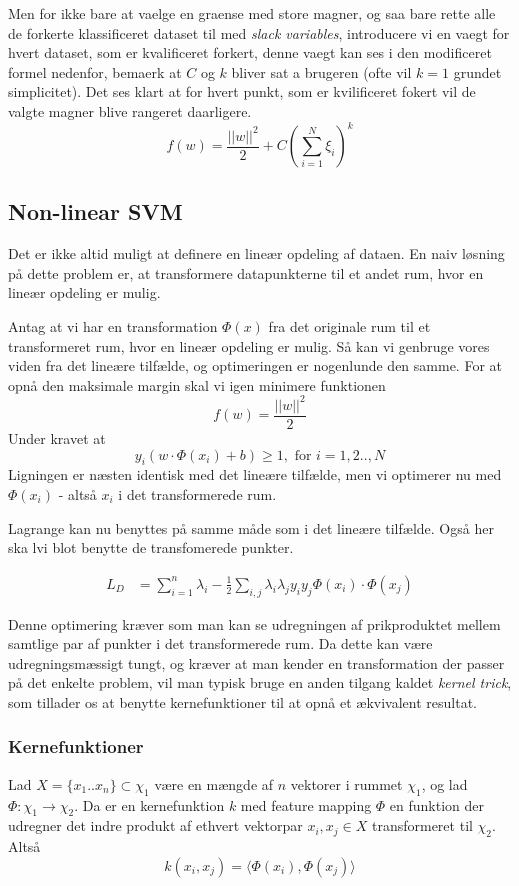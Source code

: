 \documentclass{article}
\begin{document}
Men for ikke bare at vaelge en graense med store magner, og saa bare rette alle de forkerte klassificeret dataset til med \textit{slack variables}, introducere vi en vaegt for hvert dataset, som er kvalificeret forkert, denne vaegt kan ses i den modificeret formel nedenfor, bemaerk at $C$ og $k$ bliver sat a brugeren (ofte vil $k = 1$ grundet simplicitet). Det ses klart at for hvert punkt, som er kvilificeret fokert vil de valgte magner blive rangeret daarligere. \\

$$f(w) = \frac{||w||^2}{2}+C(\sum\limits_{i=1}^N \xi_i)^k$$

\subsection{Non-linear SVM}
Det er ikke altid muligt at definere en lineær opdeling af dataen. En naiv løsning på dette problem er, at transformere datapunkterne til et andet rum, hvor en lineær opdeling er mulig.

Antag at vi har en transformation $\Phi(x)$ fra det originale rum til et transformeret rum, hvor en lineær opdeling er mulig. Så kan vi genbruge vores viden fra det lineære tilfælde, og optimeringen er nogenlunde den samme. For at opnå den maksimale margin skal vi igen minimere funktionen 
$$f(w)=\frac{||w||^2}{2}$$
Under kravet at
$$y_i(w\cdot\Phi(x_i)+b)\geq 1,\text{ for }i=1,2..,N$$
Ligningen er næsten identisk med det lineære tilfælde, men vi optimerer nu med $\Phi(x_i)$ - altså $x_i$ i det transformerede rum.

Lagrange kan nu benyttes på samme måde som i det lineære tilfælde. Også her ska lvi blot benytte de transfomerede punkter.

\begin{align*}
L_D&=\sum_{i=1}^{n}\lambda_i-\frac{1}{2}\sum_{i,j}\lambda_i\lambda_j y_iy_j\Phi(x_i)\cdot\Phi(x_j)
\end{align*}

Denne optimering kræver som man kan se udregningen af prikproduktet mellem samtlige par af punkter i det transformerede rum. Da dette kan være udregningsmæssigt tungt, og kræver at man kender en transformation der passer på det enkelte problem, vil man typisk bruge en anden tilgang kaldet \textit{kernel trick}, som tillader os at benytte kernefunktioner til at opnå et ækvivalent resultat.


\subsubsection{Kernefunktioner}
Lad $X=\{x_1..x_n\}\subset \chi_1$ være en mængde af $n$ vektorer i rummet $\chi_1$, og lad $\Phi:\chi_1\rightarrow\chi_2$. Da er en kernefunktion $k$ med feature mapping $\Phi$ en funktion der udregner det indre produkt af ethvert vektorpar $x_i,x_j\in X$ transformeret til $\chi_2$. Altså
\begin{equation}
k(x_i,x_j)=\langle\Phi(x_i),\Phi(x_j)\rangle
\end{equation}
\end{document}

